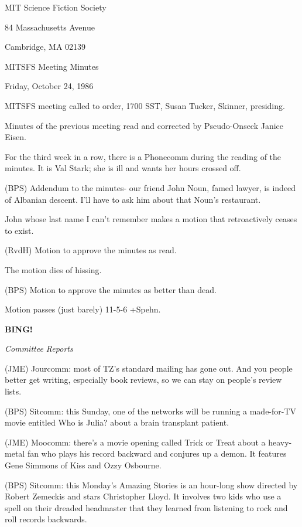 \documentclass[12pt]{article}
\newcommand{\bing}{{\bf BING!} }
\newcommand{\goto}[1]{\bing \vskip 12pt \centerline{{\em{#1}}}}
\begin{document}
\begin{center}

MIT Science Fiction Society 

84 Massachusetts Avenue

Cambridge, MA 02139

\vspace{12pt}

MITSFS Meeting Minutes 

Friday, October 24, 1986

\end{center}
 
\vspace{18pt}

\setlength{\parskip}{6pt}

\noindent
MITSFS meeting called to order, 1700 SST,
Susan Tucker, Skinner, presiding.

Minutes of the previous meeting read and corrected by Pseudo-Onseck Janice Eisen.

For the third week in a row, there is a Phonecomm during the reading of the minutes. It is Val Stark; she is ill and wants her hours crossed off.

(BPS) Addendum to the minutes- our friend John Noun, famed lawyer, is indeed of Albanian descent. I'll have to ask him about that Noun's restaurant.

John whose last name I can't remember makes a motion that retroactively ceases to exist.

(RvdH) Motion to approve the minutes as read.

The motion dies of hissing.

(BPS) Motion to approve the minutes as better than dead.

Motion passes (just barely) 11-5-6 +Spehn.

\goto{Committee Reports}

(JME) Jourcomm: most of TZ's standard mailing has gone out. And you people better get writing, especially book reviews, so we can stay on people's review lists.

(BPS) Sitcomm: this Sunday, one of the networks will be running a made-for-TV movie entitled Who is Julia? about a brain transplant patient.

(JME) Moocomm: there's a movie opening called Trick or Treat about a heavy-metal fan who plays his record backward and conjures up a demon. It features Gene Simmons of Kiss and Ozzy Osbourne.

(BPS) Sitcomm: this Monday's Amazing Stories is an hour-long show directed by Robert Zemeckis and stars Christopher Lloyd. It involves two kids who use a spell on their dreaded headmaster that they learned from listening to rock and roll records backwards.
\end{document}
